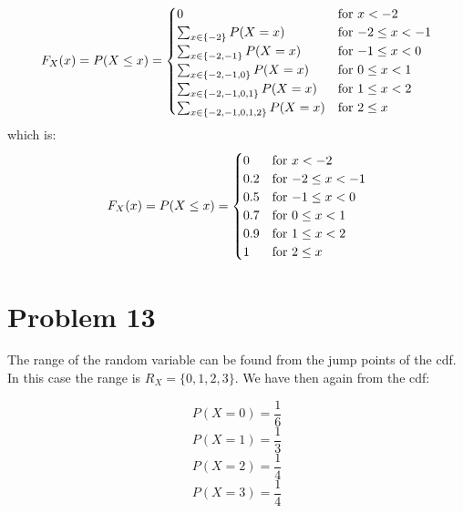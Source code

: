 \documentclass{article}
\begin{document}
\begin{equation*}
    F_{X}(x) = P(X \leq x) = 
    \begin{cases}
        0  & \mbox{for \(x < -2\)} \\
        \sum_{x \in \{-2\}} P(X = x) & \mbox{for \( -2 \leq x < -1 \)} \\
        \sum_{x \in \{-2, -1\}} P(X = x)  & \mbox{for \( -1 \leq x < 0 \)} \\
        \sum_{x \in \{-2, -1, 0\}} P(X = x) & \mbox{for \( 0 \leq x < 1 \)} \\
        \sum_{x \in \{-2, -1, 0, 1\}} P(X = x)  & \mbox{for \( 1 \leq x < 2 \)} \\
        \sum_{x \in \{-2, -1, 0, 1, 2\}} P(X = x)  & \mbox{for \(2 \leq x\)}
    \end{cases}
\end{equation*}
which is:
\begin{equation*}
    F_{X}(x) = P(X \leq x) = 
    \begin{cases}
        0  & \mbox{for \(x < -2\)} \\
        0.2  & \mbox{for \( -2 \leq x < -1 \)} \\
        0.5  & \mbox{for \( -1 \leq x < 0 \)} \\
        0.7 & \mbox{for \( 0 \leq x < 1 \)} \\
        0.9 & \mbox{for \( 1 \leq x < 2 \)} \\
        1 & \mbox{for \(2 \leq x\)}
    \end{cases}
\end{equation*}

\section*{Problem 13}

The range of the random variable can be found from the jump points of the cdf.
In this case the range is \(R_{X} = \{0, 1, 2, 3\}\). We have then again from the cdf:

\begin{equation*}
    P(X=0) = \frac{1}{6}
\end{equation*}
\begin{equation*}
    P(X=1) = \frac{1}{3}
\end{equation*}
\begin{equation*}
    P(X=2) = \frac{1}{4}
\end{equation*}
\begin{equation*}
    P(X=3) = \frac{1}{4}
\end{equation*}
\end{document}
